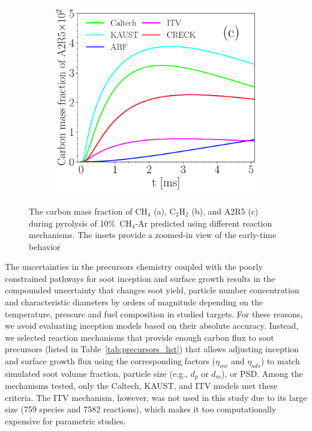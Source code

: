 \begin{figure}[H]
\begin{subfigure}[t]{0.31\textwidth}
	\end{subfigure}
	\begin{subfigure}[t]{0.31\textwidth}
		\includegraphics[width=1\textwidth]{Figures/Results/chemistry/A2R5.pdf}
	\end{subfigure}
	\caption{The carbon mass fraction of $\mathrm{CH_4}$ (a), $\mathrm{C_2H_2}$ (b), and A2R5 (c) during pyrolysis of 10\%~$\mathrm{CH_4}$-Ar predicted using different reaction mechanisms. The insets provide a zoomed-in view of the early-time behavior}
	\label{fig:CH4_C2H4_A2R5_chem} 
\end{figure}

The uncertainties in the precursors chemistry coupled with the poorly constrained pathways for soot inception and surface growth results in the compounded uncertainty that changes soot yield, particle number concentration and characteristic diameters by orders of magnitude depending on the temperature, pressure and fuel composition in studied targets. For these reasons, we avoid evaluating inception models based on their absolute accuracy. Instead, we selected reaction mechanisms that provide enough carbon flux to soot precursors (listed in Table~\ref{tab:precursors_list}) that allows adjusting inception and surface growth flux using the corresponding factors ($\eta_{inc}$ and $\eta_{ads}$) to match simulated soot volume fraction, particle size (e.g., $d_p$ or $d_m$), or PSD. Among the mechanisms tested, only the Caltech, KAUST, and ITV models met these criteria. The ITV mechanism, however, was not used in this study due to its large size (759 species and 7582 reactions), which makes it too computationally expensive for parametric studies.


